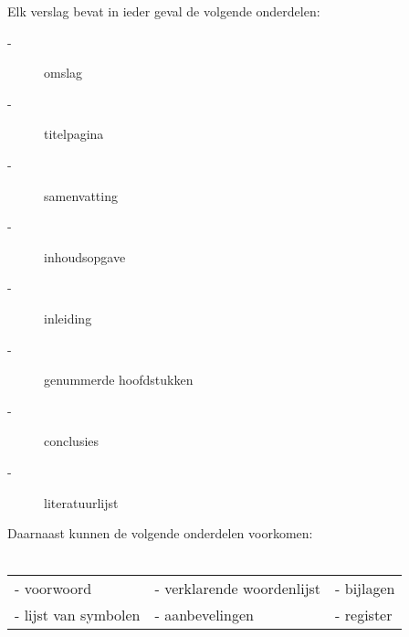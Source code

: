 Elk verslag bevat in ieder geval de volgende onderdelen: 
\begin{description}
\item[-] omslag 
\item[-] titelpagina 
\item[-] samenvatting 
\item[-] inhoudsopgave
\item[-] inleiding 
\item[-] genummerde hoofdstukken 
\item[-] conclusies
\item[-] literatuurlijst
\end{description}
Daarnaast kunnen de volgende onderdelen voorkomen: \\
\\
\begin{tabular}{lll}

- voorwoord              &- verklarende woordenlijst    &- bijlagen  \\
- lijst van symbolen     &- aanbevelingen               &- register  \\
\end{tabular}

